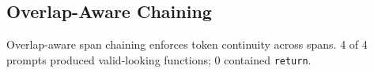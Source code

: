 \subsection{Overlap-Aware Chaining}
Overlap-aware span chaining enforces token continuity across spans.
4 of 4 prompts produced valid-looking functions; 0 contained \texttt{return}.
